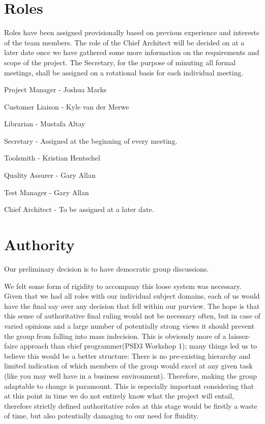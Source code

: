 \documentclass{l3deliverable}
\begin{document}

\section{Roles}

Roles have been assigned provisionally based on previous experience and interests of the team members. The role of the Chief Architect will be decided on at a later date once we have gathered some more information on the requirements and scope of the project. The Secretary, for the purpose of minuting all formal meetings, shall be assigned on a rotational basis for each individual meeting.

\begin{list}{}{}
\item Project Manager - Joshua Marks
\item Customer Liaison - Kyle van der Merwe
\item Librarian - Mustafa Altay
\item Secretary - Assigned at the beginning of every meeting.
\item Toolsmith - Kristian Hentschel
\item Quality Assurer - Gary Allan
\item Test Manager - Gary Allan
\item Chief Architect - To be assigned at a later date.
\end{list}



\section{Authority}



Our preliminary decision is to have democratic group discussions.

We felt some form of rigidity to accompany this loose system was necessary. Given that we had all roles with our individual subject domains, each of us would have the final say over any decision that fell within our purview.
The hope is that this sense of authoritative final ruling would not be necessary often, but in case of varied opinions and a large number of potentially strong views it should prevent the group from falling into mass indecision. This is obviously more of a laissez-faire approach than chief programmer(PSD3 Workshop 1); many things led us to believe this would be a better structure:
There is no pre-existing hierarchy and limited indication of which members of the group would excel at any given task (like you may well have in a business environment). Therefore, making the group adaptable to change is paramount.
This is especially important considering that at this point in time we do not entirely know what the project will entail, therefore strictly defined authoritative roles at this stage would be firstly a waste of time, but also potentially damaging to our need for fluidity. 
\end{document}

